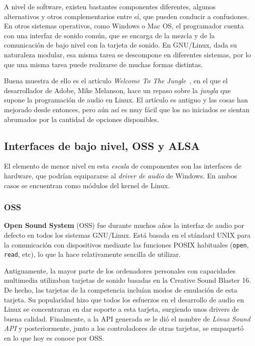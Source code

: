 A nivel de software, existen bastantes componentes diferentes, algunos
alternativos y otros complementarios entre sí, que pueden conducir a
confusiones. En otros sistemas operativos, como Windows o Mac OS, el programador
cuenta con una interfaz de sonido común, que se encarga de la mezcla y de la
comunicación de bajo nivel con la tarjeta de sonido. En GNU/Linux, dada su
naturaleza modular, esa misma tarea se descompone en diferentes sistemas, por lo
que una misma tarea puede realizarse de muchas formas distintas.

Buena muestra de ello es el artículo \textit{Welcome To The Jungle}~\cite{welcomejungle},
en el que el desarrollador de Adobe, Mike Melanson, hace un repaso sobre la
\textit{jungla} que supone la programación de audio en Linux. El artículo es
antiguo y las cosas han mejorado desde entonces, pero aún así es muy fácil que
los no iniciados se sientan abrumados por la cantidad de opciones disponibles.

\subsection{Interfaces de bajo nivel, OSS y ALSA}
El elemento de menor nivel en esta \textit{escala} de componentes son las
interfaces de hardware, que podrían equipararse al \textit{driver de audio} de
Windows. En ambos casos se encuentran como módulos del kernel de Linux.

\subsubsection{OSS}
\textbf{Open Sound System} (OSS) fue durante muchos años la interfaz de audio
por defecto en todos los sistemas GNU/Linux. Está basada en el stándard UNIX
para la comunicación con dispositivos mediante las funciones POSIX habituales
(\texttt{open}, \texttt{read}, etc), lo que la hace relativamente sencilla de
utilizar.

Antiguamente, la mayor parte de los ordenadores personales con capacidades
multimedia utilizaban tarjetas de sonido basadas en la Creative Sound Blaster
16. De hecho, las tarjetas de la competencia incluían modos de emulación de esta
tarjeta. Su popularidad hizo que todos los esfuerzos en el desarrollo de audio
en Linux se concentraran en dar soporte a esta tarjeta, surgiendo unos drivers
de buena calidad. Finalmente, a la API generada se le dió el nombre de
\textit{Linux Sound API} y posteriormente, junto a los controladores de otras
tarjetas, se empaquetó en lo que hoy es conoce por OSS.

